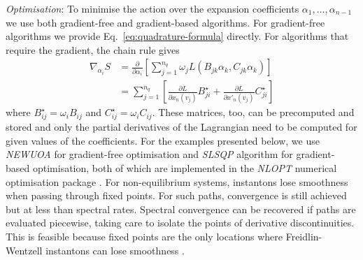 \emph{Optimisation}: To minimise the action over the expansion coefficients
$\alpha_{1},\ldots,\alpha_{n-1}$ we use both gradient-free and gradient-based
algorithms. For gradient-free algorithms we provide Eq.~\ref{eq:quadrature-formula}
directly. For algorithms that require the gradient, the chain rule
gives
\begin{align}
\nabla_{\alpha_{i}}S & =\frac{\partial}{\partial\alpha_{i}}\left[\sum_{j=1}^{n_{q}}\omega_{j}L(B_{jk}\alpha_{k},C_{jk}\alpha_{k})\right]\\
 & =\sum_{j=1}^{n_{q}}\left[\frac{\partial L}{\partial x_{n}(v_{j})}B_{ji}^{\star}+\frac{\partial L}{\partial x'_{n}(v_{j})}C_{ji}^{\star}\right]\nonumber 
\end{align}
where $B_{ij}^{\star}=\omega_{i}B_{ij}$ and $C_{ij}^{\star}=\omega_{i}C_{ij}$.
These matrices, too, can be precomputed and stored and only the partial
derivatives of the Lagrangian need to be computed for given values
of the coefficients. For the examples presented below, we use \emph{NEWUOA}
\citep{powell2006newuoa} for gradient-free optimisation and \emph{SLSQP}
algorithm \citep{kraft1988software} for gradient-based optimisation,
both of which are implemented in the \emph{NLOPT} numerical optimisation
package \citep{johnson2014nlopt}. For non-equilibrium systems, instantons
lose smoothness when passing through fixed points. For such paths,
convergence is still achieved but at less than spectral rates. Spectral
convergence can be recovered if paths are evaluated piecewise, taking
care to isolate the points of derivative discontinuities. This is
feasible because fixed points are the only locations where Freidlin-Wentzell
instantons can lose smoothness \citep{graham1987macroscopic}. %

